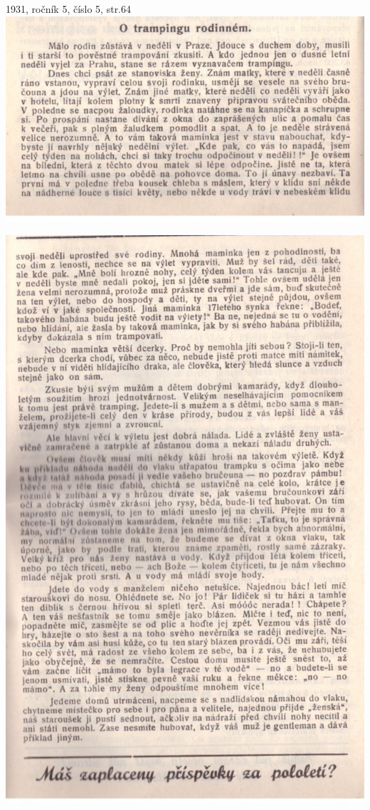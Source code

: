 \documentclass[11pt]{article}
\begin{document}
\vspace*{\baselineskip}
1931, ročník 5, číslo 5, str.64 \\
\includegraphics[width=\imagewidth]{original/1931/Skener_20250315 (6).jpg}

\includegraphics[width=\imagewidth]{original/1931/Skener_20250315 (7).jpg}
\end{document}

